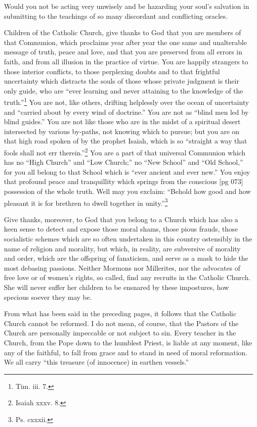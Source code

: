 Would you not be acting very unwisely and be
hazarding your soul's salvation in submitting to
the teachings of so many discordant and conflicting
oracles.

Children of the Catholic Church, give thanks to
God that you are members of that Communion,
which proclaims year after year the one same and
unalterable message of truth, peace and love, and
that you are preserved from all errors in faith,
and from all illusion in the practice of virtue. You
are happily strangers to those interior conflicts, to
those perplexing doubts and to that frightful uncertainty
which distracts the souls of those whose
private judgment is their only guide, who are
“ever learning and never attaining to the knowledge
of the truth.”\footnote{Tim. iii.
7.} You are not, like others,
drifting helplessly over the ocean of uncertainty
and “carried about by every wind of doctrine.”
You are not as “blind men led by blind guides.”
You are not like those who are in the midst of a
spiritual desert intersected by various by-paths,
not knowing which to pursue; but you are on that
high road spoken of by the prophet Isaiah, which is
so “straight a way that fools shall not err therein.”\footnote{Isaiah
xxxv. 8.}
You are a part of that universal Communion
which has no “High Church” and “Low
Church;” no “New School” and “Old School,”
for you all belong to that School which is “ever
ancient and ever new.” You enjoy that profound
peace and tranquillity which springs from the conscious
[pg 073]
possession of the whole truth. Well may
you exclaim: “Behold how good and how pleasant
it is for brethren to dwell together in unity.”\footnote{Ps. cxxxii.}

Give thanks, moreover, to God that you belong
to a Church which has also a keen sense to detect
and expose those moral shams, those pious frauds,
those socialistic schemes which are so often undertaken
in this country ostensibly in the name of religion
and morality, but which, in reality, are subversive
of morality and order, which are the offspring
of fanaticism, and serve as a mask to hide
the most debasing passions. Neither Mormons
nor Millerites, nor the advocates of free love or of
women's rights, so called, find any recruits in the
Catholic Church. She will never suffer her children
to be ensnared by these impostures, how specious
soever they may be.

From what has been said in the preceding pages,
it follows that the Catholic Church cannot be reformed.
I do not mean, of course, that the Pastors
of the Church are personally impeccable or
not subject to sin. Every teacher in the Church,
from the Pope down to the humblest Priest, is liable
at any moment, like any of the faithful, to
fall from grace and to stand in need of moral
reformation. We all carry “this treasure (of innocence)
in earthen vessels.”

